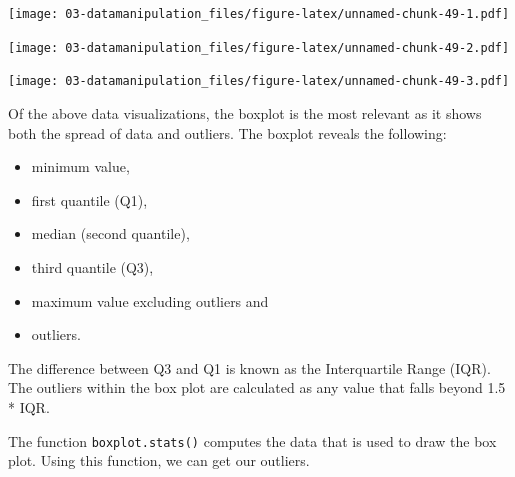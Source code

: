 \documentclass[
]{book}
\newenvironment{Shaded}{\begin{snugshade}}{\end{snugshade}}
\newcommand{\CommentTok}[1]{\textcolor[rgb]{0.56,0.35,0.01}{\textit{#1}}}
\newcommand{\FunctionTok}[1]{\textcolor[rgb]{0.00,0.00,0.00}{#1}}
\newcommand{\NormalTok}[1]{#1}
\newcommand{\SpecialCharTok}[1]{\textcolor[rgb]{0.00,0.00,0.00}{#1}}
\providecommand{\tightlist}{%
  \setlength{\itemsep}{0pt}\setlength{\parskip}{0pt}}
\begin{document}
\texttt{[image: 03-datamanipulation\_files/figure-latex/unnamed-chunk-49-1.pdf]}

\begin{Shaded}
\end{Shaded}

\texttt{[image: 03-datamanipulation\_files/figure-latex/unnamed-chunk-49-2.pdf]}

\begin{Shaded}
\end{Shaded}

\texttt{[image: 03-datamanipulation\_files/figure-latex/unnamed-chunk-49-3.pdf]}

Of the above data visualizations, the boxplot is the most relevant as it shows both the spread of data and outliers. The boxplot reveals the following:

\begin{itemize}
\tightlist
\item
  minimum value,
\item
  first quantile (Q1),
\item
  median (second quantile),
\item
  third quantile (Q3),
\item
  maximum value excluding outliers and
\item
  outliers.
\end{itemize}

The difference between Q3 and Q1 is known as the Interquartile Range (IQR). The outliers within the box plot are calculated as any value that falls beyond 1.5 * IQR.

The function \texttt{boxplot.stats()} computes the data that is used to draw the box plot. Using this function, we can get our outliers.

\begin{Shaded}
\end{Shaded}
\end{document}

